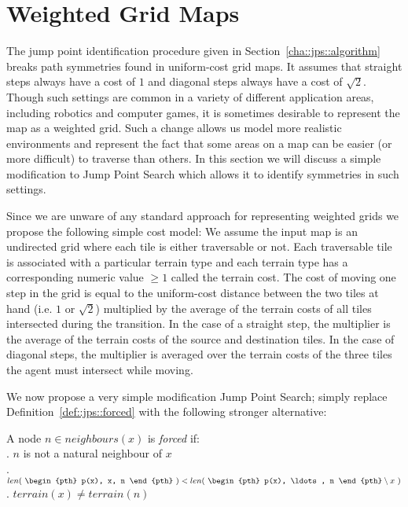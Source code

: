 \section{Weighted Grid Maps}
\label{cha::jps::weighted}

The jump point identification procedure given in
Section~\ref{cha::jps::algorithm} breaks path symmetries found in uniform-cost
grid maps. It assumes that straight steps always have a cost of $1$ and
diagonal steps always have a cost of $\sqrt{2}$.  Though such settings are
common in a variety of different application areas, including robotics and
computer games, it is sometimes desirable to represent the map as a weighted
grid. Such a change allows us model more realistic environments and represent
the fact that some areas on a map can be easier (or more difficult) to
traverse than others.  In this section we will discuss a simple modification
to  Jump Point Search which allows it to identify symmetries in such settings.

Since we are unware of any standard approach for representing weighted grids
we propose the following simple cost model:
We assume the input map is an undirected grid where each tile is either
traversable or not.  Each traversable tile is associated with a particular
terrain type and each terrain type has a corresponding numeric value 
$\ge 1$ called the terrain cost.
The cost of moving one step in the grid is equal to the uniform-cost
distance between the two tiles at hand (i.e. $1$ or $\sqrt{2}$) multiplied by
the average of the terrain costs of all tiles intersected during the
transition.  In the case of a straight step, the multiplier is the average of
the terrain costs of the source and destination tiles. In the case of diagonal
steps, the multiplier is averaged over the terrain costs of the three tiles
the agent must intersect while moving.

We now propose a very simple modification Jump Point Search; 
simply replace Definition~\ref{def::jps::forced} with the following
stronger alternative:

\begin{definition}
\label{def::jps::wforced}
A node $n \in neighbours(x)$ is \emph{forced} if: \\
. $n$ is not a natural neighbour of $x$\\
. $ len(~\begin{pth} p(x), x, n \end{pth}~) < len(~ \begin{pth} p(x), \ldots, n \end{pth} \setminus x~)$ \\
. $terrain(x) \neq terrain(n)$
\end{definition}

